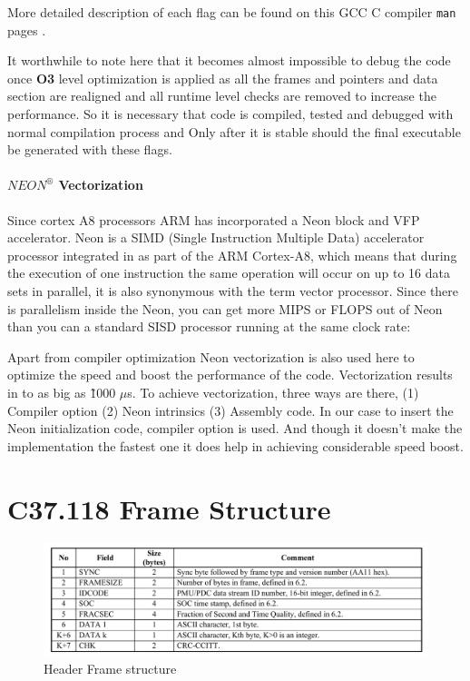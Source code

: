 \begin{appendix}
More detailed description of each flag can be found on this GCC C compiler \texttt{man} pages \cite{compilerOpti}.

It worthwhile to note here that it becomes almost impossible to debug the code once \textbf{O3} level optimization is applied as all the frames and pointers and data section are realigned and all runtime level checks are removed to increase the performance. So it is necessary that code is compiled, tested and debugged with normal compilation process and Only after it is stable should the final executable be generated with these flags.

\subsubsection{$NEON ^{\circledR}$ Vectorization }
Since cortex A8 processors ARM has incorporated a Neon block and VFP accelerator. Neon is a SIMD (Single Instruction Multiple Data) accelerator processor integrated in as part of the ARM Cortex-A8, which means that during the execution of one instruction the same operation will occur on up to 16 data sets in parallel, it is also synonymous with the term vector processor. Since there is parallelism inside the Neon, you can get more MIPS or FLOPS out of Neon than you can a standard SISD processor running at the same clock rate:

  Apart from compiler optimization Neon vectorization is also used here to optimize the speed and boost the performance of the code. Vectorization results in to as big as \~1000 $\mu$s. To achieve vectorization, three ways are there, (1) Compiler option (2) Neon intrinsics (3) Assembly code. In our case to insert the Neon initialization code, compiler option is used. And though it doesn't make the implementation the fastest one it does help in achieving considerable speed boost.


\chapter{C37.118 Frame Structure}


\begin{figure}[h]
	\includegraphics[width=\textwidth]{fig/hdr_frame.png}
	\caption{Header Frame structure \cite{c37.118.2}}
\end{figure}


\end{appendix}
